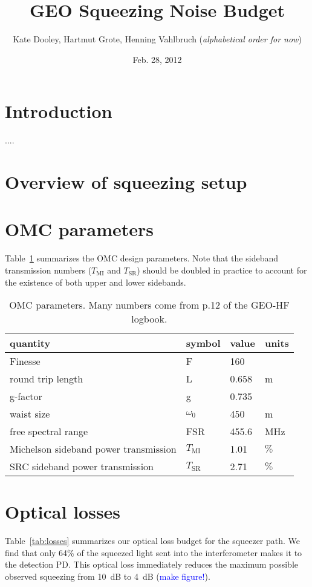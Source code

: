\documentclass{ligodoc}
\title{GEO Squeezing Noise Budget}
\author{Kate Dooley, Hartmut Grote, Henning Vahlbruch (\emph{alphabetical order for now})}
\date{Feb. 28, 2012}
\newcommand{\micro}{\textmu{}}
\begin{document}
\section{Introduction}
....


\section{Overview of squeezing setup}



\section{OMC parameters}
Table~\ref{tab:OMCparams} summarizes the OMC design parameters. Note
that the sideband transmission numbers ($T_{\mathrm{MI}}$ and
$T_{\mathrm{SR}}$) should be doubled in practice to account for the
existence of both upper and lower sidebands.

\begin{table}
\centering
\caption{OMC parameters. Many numbers come from p.12 of the GEO-HF logbook.}
\begin{tabular}{l l l l} %
\hline
quantity & symbol & value & units \\
\hline
Finesse & F & 160 & \\
round trip length & L & 0.658 & m \\
g-factor & g & 0.735 & \\
waist size & $\omega_0$ & 450 & \micro m \\
free spectral range & FSR & 455.6 & MHz \\
Michelson sideband power transmission & $T_{\mathrm{MI}}$ & 1.01 & $\%$ \\
SRC sideband power transmission & $T_{\mathrm{SR}}$ & 2.71 & $\%$ \\
\hline
\end{tabular}
\label{tab:OMCparams}
\end{table}



\section{Optical losses}
Table~\ref{tab:losses} summarizes our optical loss budget for the
squeezer path. We find that only 64\% of the squeezed light sent into
the interferometer makes it to the detection PD. This optical loss
immediately reduces the maximum possible observed squeezing from 10~dB
to 4~dB (\textcolor{blue}{make figure!}).
\end{document}
